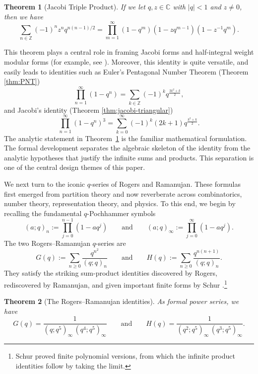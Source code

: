 \documentclass[12pt]{amsart}
\newtheorem{theorem}{Theorem}[subsection]
\theoremstyle{definition}
\theoremstyle{remark}
\numberwithin{equation}{subsection}
\DeclarePairedDelimiter\abs{\lvert}{\rvert}
\newcommand{\C}{\mathbb C}
\newcommand{\Z}{\mathbb Z}
\renewcommand{\abs}[1]{\left\vert #1 \right \vert}
\begin{document}
\begin{theorem}[Jacobi Triple Product]\label{thm:JTP} If we let  $q,z\in\C$ with $\abs{q}<1$ and $z\ne 0$, then we have
$$
\sum_{n\in\Z}(-1)^n z^n q^{n(n-1)/2}
=
\prod_{m=1}^{\infty}(1-q^m)(1-zq^{m-1})(1-z^{-1}q^m).
$$
\end{theorem}

This theorem plays a central role in framing Jacobi forms and half-integral weight modular forms (for example, see \cite{BFOR,EichlerZagier}). Moreover, this identity is quite versatile, and easily leads to identities such as Euler's Pentagonal Number Theorem (Theorem \ref{thm:PNT})
$$
\prod_{n=1}^{\infty} (1-q^n)=\sum_{k\in \Z} (-1)^k q^{\frac{3k^2+k}{2}},
$$
and Jacobi's identity (Theorem \ref{thm:jacobi-triangular})
$$
\prod_{n=1}^{\infty} (1-q^n)^3 = \sum_{k=0}^{\infty} (-1)^k (2k+1)q^{\frac{k^2+k}{2}}.
$$
The analytic statement in Theorem~\ref{thm:JTP} is the familiar mathematical formulation. The formal development separates the algebraic skeleton of the identity from the analytic hypotheses that justify the infinite sums and products.  This separation is one of the central design themes of this paper.

We next turn to the iconic $q$-series of Rogers and Ramanujan.  These formulas first emerged from partition theory and now reverberate across combinatorics, number theory, representation theory, and physics. To this end, we begin by recalling the fundamental $q$-Pochhammer symbols
\begin{equation}
(a;q)_n:=\prod_{j=0}^{n-1}(1-aq^{j}) \qquad\text{and}\qquad
(a;q)_\infty:=\prod_{j=0}^{\infty}(1-aq^{j}).
\end{equation}
The two Rogers--Ramanujan $q$-series are
\begin{equation}\label{RR1}
G(q):=\sum_{n\ge 0}\frac{q^{n^2}}{(q;q)_n} \qquad {\text {and}} \qquad
H(q):=\sum_{n\ge 0}\frac{q^{n(n+1)}}{(q;q)_n}.
\end{equation}
They satisfy the striking sum-product identities discovered by Rogers, rediscovered by Ramanujan, and given important finite forms by Schur \cite{Rogers1894,RR1919,Schur1917}.\footnote{Schur proved finite polynomial versions, from which the infinite product identities follow by taking the limit.}

\begin{theorem}[The Rogers--Ramanujan identities]\label{thm:RR_Identities}
As formal power series, we have
\begin{equation}
G(q)=\frac{1}{(q;q^5)_\infty\,(q^{4};q^{5})_\infty} \qquad {\text {and}} \qquad
H(q)=\frac{1}{(q^{2};q^{5})_\infty\,(q^{3};q^{5})_\infty}.
\end{equation}
\end{theorem}
\end{document}
